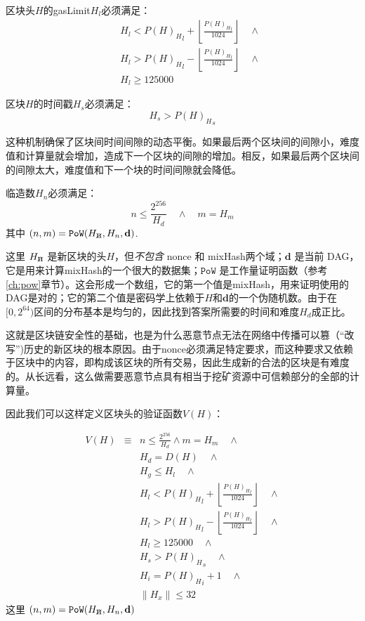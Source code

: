\documentclass[UTF8,nofonts]{ctexart}
\newcommand{\hcancel}[1]{%
    \tikz[baseline=(tocancel.base)]{
        \node[inner sep=0pt,outer sep=0pt] (tocancel) {#1};
        \draw[black] (tocancel.south west) -- (tocancel.north east);
    }%
}%
\begin{document}
\begin{multicols}{2}
区块头$H$的gasLimit$H_l$必须满足：
\begin{eqnarray}
& & H_l < {P(H)_H}_l + \left\lfloor\frac{{P(H)_H}_l}{1024}\right\rfloor \quad \wedge \\
& & H_l > {P(H)_H}_l - \left\lfloor\frac{{P(H)_H}_l}{1024}\right\rfloor \quad \wedge \\
& & H_l \geqslant 125000
\end{eqnarray}

区块$H$的时间戳$H_s$必须满足：
\begin{equation}
H_s > {P(H)_H}_s
\end{equation}

这种机制确保了区块间时间间隙的动态平衡。如果最后两个区块间的间隙小，难度值和计算量就会增加，造成下一个区块的间隙的增加。相反，如果最后两个区块间的间隙太大，难度值和下一个块的时间间隙就会降低。

临造数$H_n$必须满足：
\begin{equation}
n \leqslant \frac{2^{256}}{H_d} \quad \wedge \quad m = H_m
\end{equation}
其中 $(n, m) = \mathtt{PoW}(H_{\hcancel{n}}, H_n, \mathbf{d})$.

这里 $H_{\hcancel{n}}$ 是新区块的头$H$，但\textit{不包含} nonce 和 mixHash两个域；$\mathbf{d}$ 是当前 DAG，它是用来计算mixHash的一个很大的数据集；$\mathtt{PoW}$ 是工作量证明函数（参考\ref{ch:pow}章节）。这会形成一个数组，它的第一个值是mixHash，用来证明使用的DAG是对的；它的第二个值是密码学上依赖于$H$和$\mathbf{d}$的一个伪随机数。由于在$[0, 2^{64})$区间的分布基本是均匀的，因此找到答案所需要的时间和难度$H_d$成正比。

这就是区块链安全性的基础，也是为什么恶意节点无法在网络中传播可以篡（``改写'')历史的新区块的根本原因。由于nonce必须满足特定要求，而这种要求又依赖于区块中的内容，即构成该区块的所有交易，因此生成新的合法的区块是有难度的。从长远看，这么做需要恶意节点具有相当于挖矿资源中可信赖部分的全部的计算量。

因此我们可以这样定义区块头的验证函数$V(H)$：

\begin{eqnarray}
V(H) & \equiv &  n \leqslant \frac{2^{256}}{H_d} \wedge m = H_m \quad \wedge \\
& & H_d = D(H) \quad \wedge \\
& & H_g \le H_l  \quad \wedge \\
& & H_l < {P(H)_H}_l + \left\lfloor\frac{{P(H)_H}_l}{1024}\right\rfloor  \quad \wedge \\
& & H_l > {P(H)_H}_l - \left\lfloor\frac{{P(H)_H}_l}{1024}\right\rfloor  \quad \wedge \\
& & H_l \geqslant 125000  \quad \wedge \\
& & H_s > {P(H)_H}_s \quad \wedge \\
& & H_i = {P(H)_H}_i +1 \quad \wedge \\
& & \lVert H_x \rVert \le 32
\end{eqnarray}
这里 $(n, m) = \mathtt{PoW}(H_{\hcancel{n}}, H_n, \mathbf{d})$


\end{multicols}
\end{document}
